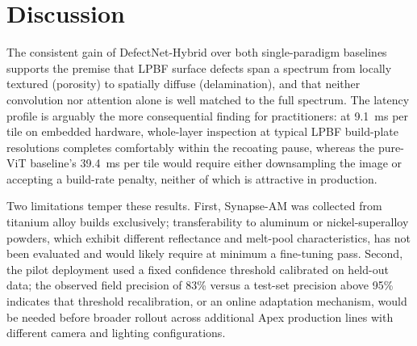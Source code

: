 \section{Discussion}
The consistent gain of DefectNet-Hybrid over both single-paradigm baselines supports the premise that LPBF surface defects span a spectrum from locally textured (porosity) to spatially diffuse (delamination), and that neither convolution nor attention alone is well matched to the full spectrum. The latency profile is arguably the more consequential finding for practitioners: at 9.1~ms per tile on embedded hardware, whole-layer inspection at typical LPBF build-plate resolutions completes comfortably within the recoating pause, whereas the pure-ViT baseline's 39.4~ms per tile would require either downsampling the image or accepting a build-rate penalty, neither of which is attractive in production.

Two limitations temper these results. First, Synapse-AM was collected from titanium alloy builds exclusively; transferability to aluminum or nickel-superalloy powders, which exhibit different reflectance and melt-pool characteristics, has not been evaluated and would likely require at minimum a fine-tuning pass. Second, the pilot deployment used a fixed confidence threshold calibrated on held-out data; the observed field precision of 83\% versus a test-set precision above 95\% indicates that threshold recalibration, or an online adaptation mechanism, would be needed before broader rollout across additional Apex production lines with different camera and lighting configurations.

